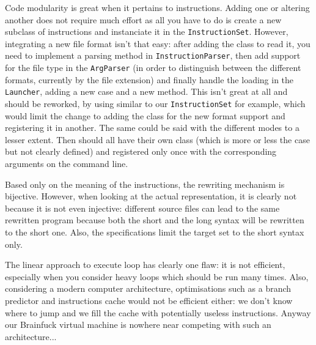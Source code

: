 \documentclass{article}
\begin{document}
Code modularity is great when it pertains to instructions. Adding one or altering another does not require much effort as all you have to do is create a new subclass of instructions and instanciate it in the \texttt{InstructionSet}. However, integrating a new file format isn't that easy: after adding the class to read it, you need to implement a parsing method in \texttt{InstructionParser}, then add support for the file type in the \texttt{ArgParser} (in order to distinguish between the different formats, currently by the file extension) and finally handle the loading in the \texttt{Launcher}, adding a new case and a new method. This isn't great at all and should be reworked, by using similar to our \texttt{InstructionSet} for example, which would limit the change to adding the class for the new format support and registering it in another. The same could be said with the different modes to a lesser extent. Then should all have their own class (which is more or less the case but not clearly defined) and registered only once with the corresponding arguments on the command line.

Based only on the meaning of the instructions, the rewriting mechanism is bijective. However, when looking at the actual representation, it is clearly not because it is not even injective: different source files can lead to the same rewritten program because both the short and the long syntax will be rewritten to the short one. Also, the specifications limit the target set to the short syntax only.

The linear approach to execute loop has clearly one flaw: it is not efficient, especially when you consider heavy loops which should be run many times. Also, considering a modern computer architecture, optimisations such as a branch predictor and instructions cache would not be efficient either: we don't know where to jump and we fill the cache with potentially useless instructions. Anyway our Brainfuck virtual machine is nowhere near competing with such an architecture...
\end{document}
